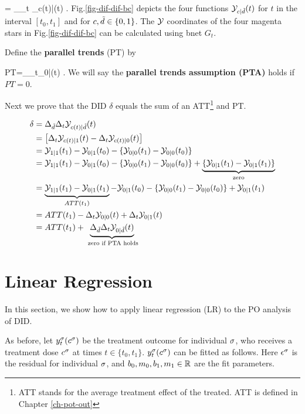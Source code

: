 \beq
\delta=
\Delta_\td\Delta_t
\caly_{c(t)|\td}(t)
\;.
\eeq
Fig.\ref{fig-dif-dif-bc}
depicts the
four functions
${\cal Y}_{c|{\tilde{d}}}(t)$
for $t$ in the interval  $[t_0, t_1]$
and for $c,{\tilde{d}}\in \{0,1\}$.
The ${\cal Y}$ coordinates
of the four magenta stars in 
Fig.\ref{fig-dif-dif-bc} can 
be calculated using bnet $G_t$.

Define
the {\bf parallel trends} (PT)
by 

\beq
PT=\Delta_\td\Delta_t\caly_{0|\td}(t)
\;.
\eeq
We will say the 
{\bf parallel trends assumption (PTA)}
holds if $PT=0$.

Next we prove that
the DID $\delta$ equals
the sum of an ATT\footnote{ATT stands for 
the average treatment effect
of the treated. ATT is defined 
in Chapter \ref{ch-pot-out}}
and PT.

\begin{align}
\delta&=
\Delta_{\tilde{d}}\Delta_t  
{\cal Y}_{c(t)|{\tilde{d}}}(t)
\\
&=
\left[
\Delta_t {\cal Y}_{c(t)|1}(t)
-\Delta_t {\cal Y}_{c(t)|0}(t)
\right]
\\
&=
{\cal Y}_{1|1}(t_1)-{\cal Y}_{0|1}(t_0)
-\{
{\cal Y}_{0|0}(t_1)-{\cal Y}_{0|0}(t_0)
\}
\\
&=
{\cal Y}_{1|1}(t_1)-{\cal Y}_{0|1}(t_0)
-\{
{\cal Y}_{0|0}(t_1)-{\cal Y}_{0|0}(t_0)
\}
+\underbrace{
\{
{\cal Y}_{0|1}(t_1)-
{\cal Y}_{0|1}(t_1)
\}}_{\text{ zero }}
\\
&=
\underbrace{
{\cal Y}_{1|1}(t_1) - {\cal Y}_{0|1}(t_1)}
_{ATT(t_1)}
-{\cal Y}_{0|1}(t_0)
-\{
{\cal Y}_{0|0}(t_1)-{\cal Y}_{0|0}(t_0)
\}
 + {\cal Y}_{0|1}(t_1)
\\
&=
ATT(t_1)
-\Delta_t {\cal Y}_{0|0}(t)
+\Delta_t {\cal Y}_{0|1}(t)
\\
&=
ATT(t_1)
+
\underbrace{\Delta_{\tilde{d}}\Delta_t{\cal Y}_{0|{\tilde{d}}}(t)}_
{\text{ zero if PTA holds}}
\end{align}





\section{Linear Regression}
In this
section,
we show how to apply
linear regression (LR)
to the PO analysis of DID.


As before, let
$y^\sigma_t(c^\sigma)$ be the treatment outcome
for individual $\sigma$,
who receives
a treatment dose
$c^\sigma$
at times $t\in\{t_0, t_1\}$.
$y^\sigma_t(c^\sigma)$
can be fitted as follows.
Here $\epsilon^\sigma$
is the residual
for individual $\sigma$,
and $b_0, m_0, b_1, m_1\in { \mathbb{R}}$
are the fit parameters.


